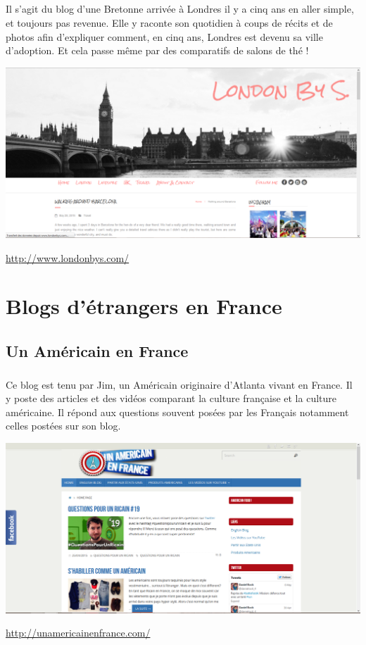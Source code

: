 \paragraph{}
Il s'agit du blog d'une Bretonne arrivée à Londres il y a cinq ans en aller simple, et toujours pas revenue. Elle y raconte son quotidien à coups de récits et de photos afin d'expliquer comment, en cinq ans, Londres est devenu sa ville d'adoption. Et cela passe même par des comparatifs de salons de thé !
\begin{center}
	\includegraphics[scale=0.25]{londonbys.png}
\end{center}
\url{http://www.londonbys.com/}

\chapter[Étrangers en France]{Blogs d'étrangers en France}

\section{Un Américain en France}

\paragraph{} Ce blog est tenu par Jim, un Américain originaire d'Atlanta vivant
en France. Il y poste des articles et des vidéos comparant la culture française
et la culture américaine. Il répond aux questions souvent posées par les
Français notamment celles postées sur son blog.

\begin{center}
	\includegraphics[scale=0.25]{Americain.png}
\end{center}
\url{http://unamericainenfrance.com/}

